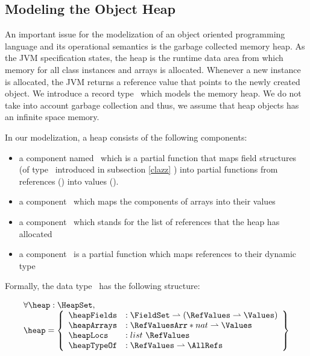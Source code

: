 

 \subsection{Modeling the Object Heap} \label{heap}
 An important issue for the modelization of an object oriented programming language and its operational semantics
 is the garbage collected memory heap. As the JVM specification states, the heap is the
 runtime data area from which memory  for all class instances and arrays is allocated. Whenever a new instance
 is allocated, the JVM returns a reference value that points to the newly created object. 
 We introduce a record type \HeapSet \ which models the memory heap. We do not take into account 
 garbage collection and thus, we assume that heap objects has an infinite space memory. 
 
 In our modelization, a heap consists of the following components:
 \begin{itemize}
       \item a component  named \heapFields \ which is a partial function that maps field
             structures (of type \FieldSet \ introduced in subsection \ref{clazz} ) into partial functions from references (\AllRefs)
	     into values (\Values).  
 

       \item  a component \heapArrays \ which maps the components of arrays  into their values

       \item  a component  \heapLocs  \ which stands for the  list of references that the heap has allocated  
              
       \item  a component \heapTypeOf   \ is a partial function  which maps references to their dynamic type 
 \end{itemize}


 Formally, the data type \HeapSet \ has the following structure:



  $$ \begin{array}{l}
         \forall  \heap : \HeapSet , \\
         \heap = \left\{\begin{array}{ll}  \heapFields  &  : \FieldSet \rightharpoonup (  \RefValues \rightharpoonup \Values) \\
                                           \heapArrays  &  : \RefValuesArr * nat \rightharpoonup \Values \\
					   \heapLocs    &  : list \ \RefValues \\
					   \heapTypeOf  &  : \RefValues \rightharpoonup \AllRefs
                    \end{array} \right\}
   \end{array} $$


